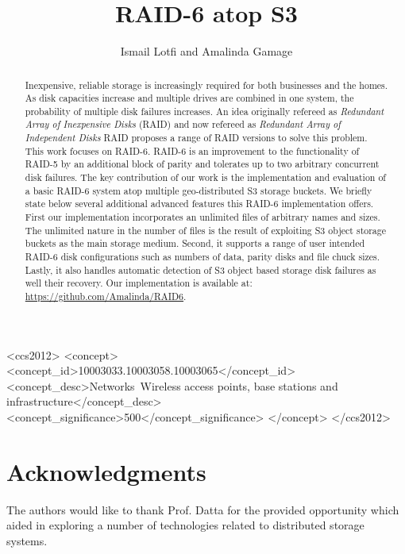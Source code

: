 \documentclass[sigconf,10pt]{acmart}
\begin{document}
\title{RAID-6 atop S3}

\author{Ismail Lotfi and Amalinda Gamage}


\begin{abstract}
Inexpensive, reliable storage is increasingly required for both businesses and the homes.
As disk capacities increase and multiple drives are combined in one system, the probability of multiple disk failures increases.
An idea originally refereed as \textit{Redundant Array of Inexpensive Disks}  (RAID) and now refereed as \textit{Redundant Array of Independent Disks} RAID proposes a range of RAID versions to solve this problem.
This work focuses on RAID-6.
RAID-6 is an improvement to the functionality of RAID-5 by an additional block of parity and tolerates up to two arbitrary concurrent disk failures.
The key contribution of our work is the implementation and evaluation of a basic RAID-6 system atop multiple geo-distributed S3 storage buckets.
We briefly state below several additional advanced features this RAID-6 implementation offers.
First our implementation incorporates an unlimited files of arbitrary names and sizes.
The unlimited nature in the number of files is the result of exploiting S3 object storage buckets as the main storage medium.
Second, it supports a range of user intended RAID-6 disk configurations such as numbers of data, parity disks and file chuck sizes.
Lastly, it also handles automatic detection of S3 object based storage disk failures as well their recovery.
Our implementation is available at: \url{https://github.com/Amalinda/RAID6}.
\end{abstract}

\begin{CCSXML}
<ccs2012>
   <concept>
       <concept_id>10003033.10003058.10003065</concept_id>
       <concept_desc>Networks~Wireless access points, base stations and infrastructure</concept_desc>
       <concept_significance>500</concept_significance>
       </concept>
</ccs2012>
\end{CCSXML}


\maketitle







\section*{Acknowledgments}
The authors would like to thank Prof. Datta for the provided opportunity which aided in exploring a number of technologies related to distributed storage systems.

\balance


\end{document}
